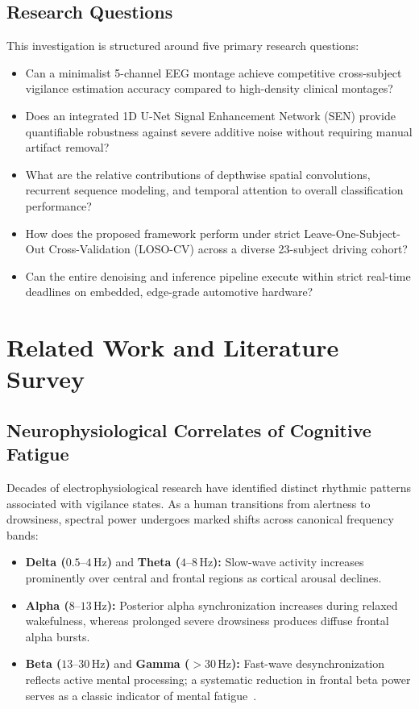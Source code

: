 \documentclass[conference]{IEEEtran}
\begin{document}
\subsection{Research Questions}
This investigation is structured around five primary research questions:
\begin{itemize}[leftmargin=*]
    \item[\textbf{RQ1}] Can a minimalist 5-channel EEG montage achieve competitive cross-subject vigilance estimation accuracy compared to high-density clinical montages?
    \item[\textbf{RQ2}] Does an integrated 1D U-Net Signal Enhancement Network (SEN) provide quantifiable robustness against severe additive noise without requiring manual artifact removal?
    \item[\textbf{RQ3}] What are the relative contributions of depthwise spatial convolutions, recurrent sequence modeling, and temporal attention to overall classification performance?
    \item[\textbf{RQ4}] How does the proposed framework perform under strict Leave-One-Subject-Out Cross-Validation (LOSO-CV) across a diverse 23-subject driving cohort?
    \item[\textbf{RQ5}] Can the entire denoising and inference pipeline execute within strict real-time deadlines on embedded, edge-grade automotive hardware?
\end{itemize}

\section{Related Work and Literature Survey}
\label{sec:related}

\subsection{Neurophysiological Correlates of Cognitive Fatigue}
Decades of electrophysiological research have identified distinct rhythmic patterns associated with vigilance states. As a human transitions from alertness to drowsiness, spectral power undergoes marked shifts across canonical frequency bands:
\begin{itemize}[leftmargin=*]
    \item \textbf{Delta ($0.5\text{--}4\,\text{Hz}$)} and \textbf{Theta ($4\text{--}8\,\text{Hz}$):} Slow-wave activity increases prominently over central and frontal regions as cortical arousal declines.
    \item \textbf{Alpha ($8\text{--}13\,\text{Hz}$):} Posterior alpha synchronization increases during relaxed wakefulness, whereas prolonged severe drowsiness produces diffuse frontal alpha bursts.
    \item \textbf{Beta ($13\text{--}30\,\text{Hz}$)} and \textbf{Gamma ($>30\,\text{Hz}$):} Fast-wave desynchronization reflects active mental processing; a systematic reduction in frontal beta power serves as a classic indicator of mental fatigue~\cite{zheng2017seedvig}.
\end{itemize}
\end{document}
